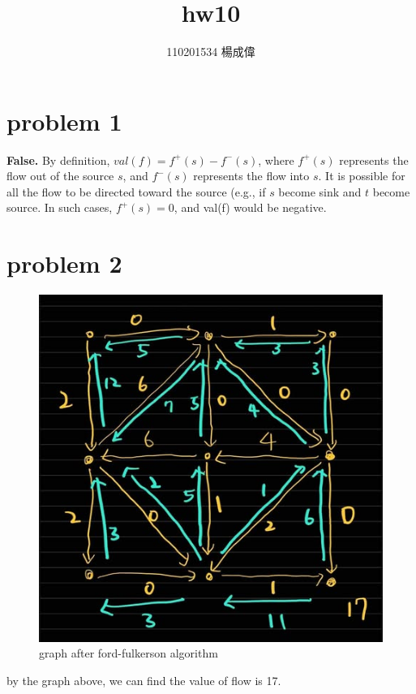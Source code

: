\documentclass{article}
\title{hw10}
\author{110201534 楊成偉}
\date{}
\begin{document}
\begin{CJK*}{UTF8}{bkai}
\maketitle

\section*{problem 1}
\textbf{False.} By definition, 
$val(f) = f^+(s) - f^-(s)$,
where \( f^+(s) \) represents the flow out of the source \( s \), and \( f^-(s) \) represents the flow into \( s \). It is possible for all the flow to be directed toward the source (e.g., if \( s \) become sink and \( t \) become source. In such cases, \( f^+(s) = 0 \), and val(f) would be negative.

\section*{problem 2}
\begin{figure}[H]
    \centering
    \includegraphics[scale = 0.3]{hw10.png}
    \caption{graph after ford-fulkerson algorithm}
\end{figure}

by the graph above, we can find the value of flow is 17.


\end{CJK*}
\end{document}
